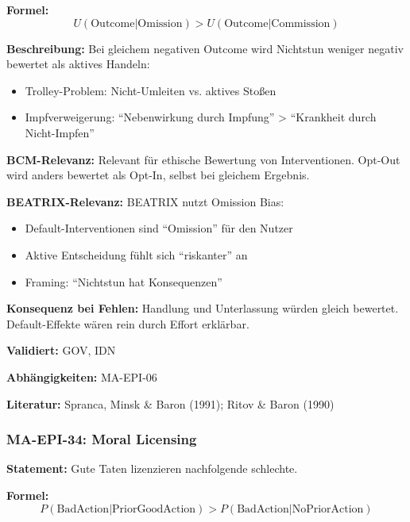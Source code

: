 \textbf{Formel:}
\begin{equation}
U(\text{Outcome}|\text{Omission}) > U(\text{Outcome}|\text{Commission})
\end{equation}

\textbf{Beschreibung:}
Bei gleichem negativen Outcome wird Nichtstun weniger negativ bewertet als aktives Handeln:
\begin{itemize}
    \item Trolley-Problem: Nicht-Umleiten vs. aktives Stoßen
    \item Impfverweigerung: ``Nebenwirkung durch Impfung'' > ``Krankheit durch Nicht-Impfen''
\end{itemize}

\textbf{BCM-Relevanz:}
Relevant für ethische Bewertung von Interventionen. Opt-Out wird anders bewertet als Opt-In, selbst bei gleichem Ergebnis.

\textbf{BEATRIX-Relevanz:}
BEATRIX nutzt Omission Bias:
\begin{itemize}
    \item Default-Interventionen sind ``Omission'' für den Nutzer
    \item Aktive Entscheidung fühlt sich ``riskanter'' an
    \item Framing: ``Nichtstun hat Konsequenzen''
\end{itemize}

\textbf{Konsequenz bei Fehlen:}
Handlung und Unterlassung würden gleich bewertet. Default-Effekte wären rein durch Effort erklärbar.

\textbf{Validiert:} GOV, IDN

\textbf{Abhängigkeiten:} MA-EPI-06

\textbf{Literatur:} Spranca, Minsk \& Baron (1991); Ritov \& Baron (1990)


\subsubsection*{MA-EPI-34: Moral Licensing}

\textbf{Statement:} Gute Taten lizenzieren nachfolgende schlechte.

\textbf{Formel:}
\begin{equation}
P(\text{BadAction}|\text{PriorGoodAction}) > P(\text{BadAction}|\text{NoPriorAction})
\end{equation}

